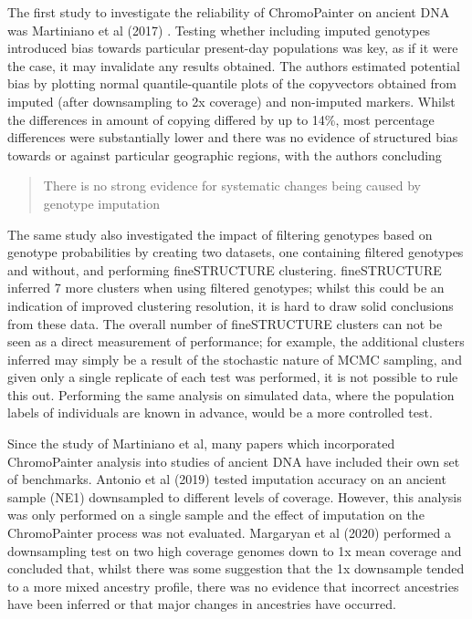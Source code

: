 The first study to investigate the reliability of ChromoPainter on ancient DNA was Martiniano et al (2017) \cite{Martiniano2017}. Testing whether including imputed genotypes introduced bias towards particular present-day populations was key, as if it were the case, it may invalidate any results obtained. The authors estimated potential bias by plotting normal quantile-quantile plots of the copyvectors obtained from imputed (after downsampling to 2x coverage) and non-imputed markers. Whilst the differences in amount of copying differed by up to 14\%, most percentage differences were substantially lower and there was no evidence of structured bias towards or against particular geographic regions, with the authors concluding \blockquote{There is no strong evidence for systematic changes being caused by genotype imputation}.


The same study also investigated the impact of filtering genotypes based on genotype probabilities by creating two datasets, one containing filtered genotypes and without, and performing fineSTRUCTURE clustering. fineSTRUCTURE inferred 7 more clusters when using filtered genotypes; whilst this could be an indication of improved clustering resolution, it is hard to draw solid conclusions from these data. The overall number of fineSTRUCTURE clusters can not be seen as a direct measurement of performance; for example, the additional clusters inferred may simply be a result of the stochastic nature of MCMC sampling, and given only a single replicate of each test was performed, it is not possible to rule this out. Performing the same analysis on simulated data, where the population labels of individuals are known in advance, would be a more controlled test. 

Since the study of Martiniano et al, many papers which incorporated ChromoPainter analysis into studies of ancient DNA have included their own set of benchmarks. Antonio et al (2019) \cite{antonio2019ancient} tested imputation accuracy on an ancient sample (NE1) downsampled to different levels of coverage. However, this analysis was only performed on a single sample and the effect of imputation on the ChromoPainter process was not evaluated. Margaryan et al (2020) performed a downsampling test on two high coverage genomes down to 1x mean coverage and concluded that, whilst there was some suggestion that the 1x downsample tended to a more mixed ancestry profile, there was no evidence that incorrect ancestries have been inferred or that major changes in ancestries have occurred. 

